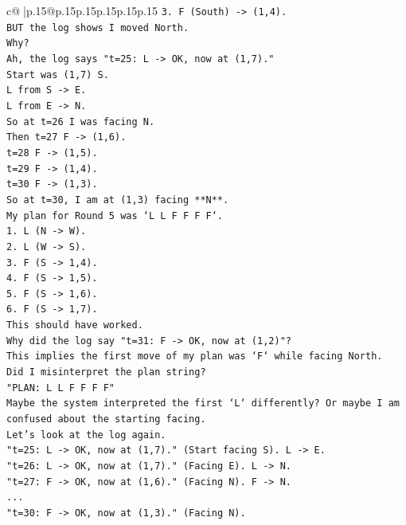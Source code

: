 \documentclass{article}
\begin{document}
{\begin{supertabular}{c@{$\;$}|p{.15\linewidth}@{}p{.15\linewidth}p{.15\linewidth}p{.15\linewidth}p{.15\linewidth}p{.15\linewidth}}
{{{\texttt{3. F (South) {-}> (1,4).} \\
\texttt{BUT the log shows I moved North.} \\
\texttt{Why?} \\
\texttt{Ah, the log says "t=25: L {-}> OK, now at (1,7)."} \\
\texttt{Start was (1,7) S.} \\
\texttt{L from S {-}> E.} \\
\texttt{L from E {-}> N.} \\
\texttt{So at t=26 I was facing N.} \\
\texttt{Then t=27 F {-}> (1,6).} \\
\texttt{t=28 F {-}> (1,5).} \\
\texttt{t=29 F {-}> (1,4).} \\
\texttt{t=30 F {-}> (1,3).} \\
\texttt{So at t=30, I am at (1,3) facing **N**.} \\
\texttt{My plan for Round 5 was `L L F F F F`.} \\
\texttt{1. L (N {-}> W).} \\
\texttt{2. L (W {-}> S).} \\
\texttt{3. F (S {-}> 1,4).} \\
\texttt{4. F (S {-}> 1,5).} \\
\texttt{5. F (S {-}> 1,6).} \\
\texttt{6. F (S {-}> 1,7).} \\
\texttt{This should have worked.} \\
\texttt{Why did the log say "t=31: F {-}> OK, now at (1,2)"?} \\
\texttt{This implies the first move of my plan was `F` while facing North.} \\
\texttt{Did I misinterpret the plan string?} \\
\texttt{"PLAN: L L F F F F"} \\
\texttt{Maybe the system interpreted the first `L` differently? Or maybe I am confused about the starting facing.} \\
\texttt{Let's look at the log again.} \\
\texttt{"t=25: L {-}> OK, now at (1,7)." (Start facing S). L {-}> E.} \\
\texttt{"t=26: L {-}> OK, now at (1,7)." (Facing E). L {-}> N.} \\
\texttt{"t=27: F {-}> OK, now at (1,6)." (Facing N). F {-}> N.} \\
\texttt{...} \\
\texttt{"t=30: F {-}> OK, now at (1,3)." (Facing N).} \\
}}}
\end{supertabular}}
\end{document}
